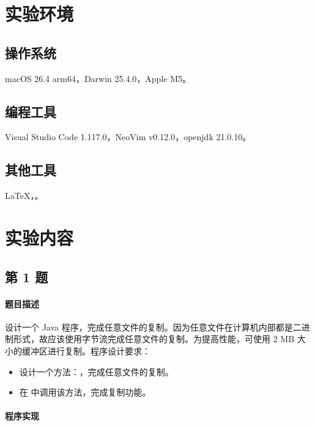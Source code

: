 \documentclass{academics}
\begin{document}
\makeacademicscover

\section{实验环境}

\subsection{操作系统}

macOS 26.4 arm64，Darwin 25.4.0，Apple M5。

\subsection{编程工具}

Visual Studio Code 1.117.0，NeoVim v0.12.0，openjdk 21.0.10。

\subsection{其他工具}

\LaTeX{}，。

\section{实验内容}

\subsection{第 1 题}

\paragraph{题目描述} {
    设计一个 Java 程序，完成任意文件的复制。因为任意文件在计算机内部都是二进制形式，故应该使用字节流完成任意文件的复制。为提高性能，可使用 $2$ MB 大小的缓冲区进行复制。程序设计要求：
    \begin{itemize}
        \item 设计一个方法：，完成任意文件的复制。
        \item 在  中调用该方法，完成复制功能。
    \end{itemize}
}

\paragraph{程序实现} {
    \inputminted[label=FileCopy.java]{java}{../src/P01/FileCopy.java}
}
\end{document}
